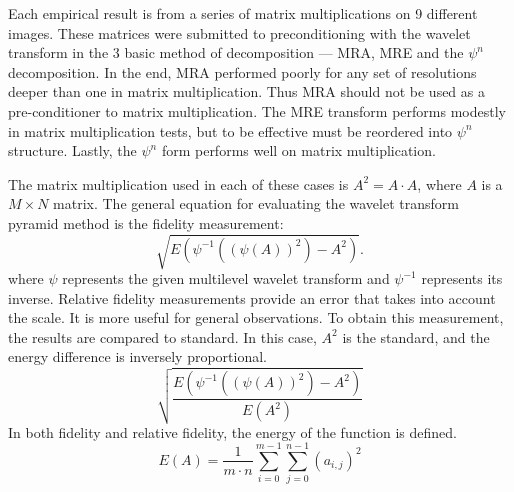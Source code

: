 


%



Each empirical result is from %
a series of matrix multiplications on 9 different images.  These matrices were submitted to preconditioning with the wavelet transform in the 3 basic method of decomposition --- MRA, MRE and the $\psi^n$ decomposition.%
In the end, MRA performed poorly for any set of resolutions deeper than one in matrix multiplication.  Thus MRA should not be used as a pre-conditioner to matrix multiplication.  The MRE transform performs modestly in matrix multiplication tests, but to be effective must be reordered into $\psi^n$ structure. %
Lastly, the $\psi^n$ form performs well on matrix multiplication.   

The matrix multiplication used in each of these cases is %
$A^2= A\cdot A$, where $A$ is  a $M\times N$ matrix.  The general equation for evaluating the wavelet transform pyramid method is the fidelity measurement:
\[
\sqrt{E(\psi^{-1} ( (\psi (A))^2) - A^2)}.
\]
where $\psi$ represents the given multilevel wavelet transform and $\psi^{-1}$ represents its inverse. Relative fidelity measurements provide an error that takes into account the scale. It is more useful for general observations.  To obtain this measurement, the results are compared to standard.  %
In this case, $A^2$ is the standard, and the energy difference is inversely proportional.
\[ \sqrt {\frac{E(\psi^{-1} ( (\psi (A))^2) - A^2)} {E(A^2)} }  \]
In both fidelity and relative fidelity, the energy of the function is defined.  
\[
E(A) = \frac{1}{m\cdot n} \sum\limits_{i=0}^{m-1} \sum\limits_{j=0}^{n-1} (a_{i,j})^2
\]

